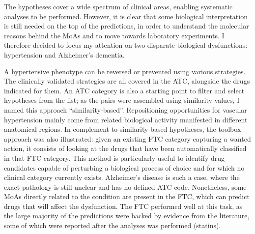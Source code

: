 The hypotheses cover a wide spectrum of clinical areas, enabling systematic analyses to be performed. However, it is clear that some biological interpretation is still needed on the top of the predictions, in order to understand the molecular reasons behind the MoAs and to move towards laboratory experiments. I therefore decided to focus my attention on two disparate biological dysfunctions: hypertension and Alzheimer’s dementia.

A hypertensive phenotype can be reversed or prevented using various strategies. The clinically validated strategies are all covered in the ATC, alongside the drugs indicated for them. An ATC category is also a starting point to filter and select hypotheses from the list; as the pairs were assembled using similarity values, I named this approach “similarity-based”. Repositioning opportunities for vascular hypertension mainly come from related biological activity manifested in different anatomical regions. In complement to similarity-based hypotheses, the toolbox approach was also illustrated: given an existing FTC category capturing a wanted action, it consists of looking at the drugs that have been automatically classified in that FTC category. This method is particularly useful to identify drug candidates capable of perturbing a biological process of choice and for which no clinical category currently exists. Alzheimer's disease is such a case, where the exact pathology is still unclear and has no defined ATC code. Nonetheless, some MoAs directly related to the condition are present in the FTC, which can predict drugs that will affect the dysfunction. The FTC performed well at this task, as the large majority of the predictions were backed by evidence from the literature, some of which were reported after the analyses was performed (statins).

